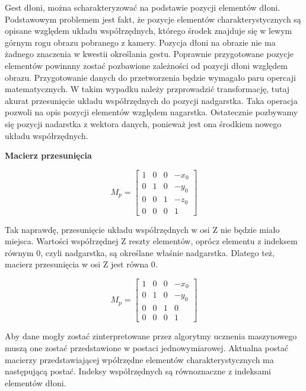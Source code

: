 \quad Gest dłoni, można scharakteryzować na podstawie pozycji elementów dłoni. Podstawowym problemem jest fakt, że pozycje elementów charakterystycznych są opisane względem układu współrzędnych, którego środek znajduje się w lewym górnym rogu obrazu pobranego z kamery. Pozycja dłoni na obrazie nie ma żadnego znaczenia w kwestii określania gestu. Poprawnie przygotowane pozycje elementów powinnny zostać pozbawione zależności od pozycji dłoni względem obrazu. 
\quad Przygotowanie danych do przetworzenia będzie wymagało paru opercaji matematycznych. W takim wypadku należy przprowadzić transformację, tutaj akurat przesunięcie układu współrzędnych do pozycji nadgarstka. Taka operacja pozwoli na opis pozycji elementów względem nagarstka. Ostatecznie pozbywamy się pozycji nadarstka z wektora danych, ponieważ jest ona środkiem nowego układu współrzędnych. 

\quad \textbf{Macierz przesunięcia}

\begin{equation*}
    M_p = 
    \begin{bmatrix}
    1 & 0 & 0 & -x_0 \\
    0 & 1 & 0 & -y_0 \\
    0 & 0 & 1 & -z_0 \\
    0 & 0 & 0 & 1
    \end{bmatrix}
\end{equation*}

\quad Tak naprawdę, przesunięcie układu współrzędnych w osi Z nie będzie miało miejsca. Wartości współrzędnej Z reszty elementów, oprócz elementu z indeksem równym 0, czyli nadgarstka, są określane właśnie nadgarstka. Dlatego też, macierz przesunięcia w osi Z jest równa 0. 

\begin{equation*}
    M_p = 
    \begin{bmatrix}
    1 & 0 & 0 & -x_0 \\
    0 & 1 & 0 & -y_0 \\
    0 & 0 & 1 & 0 \\
    0 & 0 & 0 & 1
    \end{bmatrix}
\end{equation*}

\quad Aby dane mogły zostać zinterpretowane przez algorytmy ucznenia maszynowego muszą one zostać przedstawione w postaci jednowymiarowej. Aktualna postać macierzy przedstawiającej wpółrzędne elementów charakterystycznych ma następującą postać. Indeksy współrzędnych są równoznaczne z indeksami elementów dłoni. 

